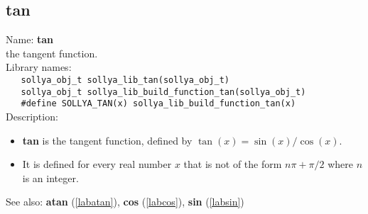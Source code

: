 \subsection{tan}
\label{labtan}
\noindent Name: \textbf{tan}\\
\phantom{aaa}the tangent function.\\[0.2cm]
\noindent Library names:\\
\verb|   sollya_obj_t sollya_lib_tan(sollya_obj_t)|\\
\verb|   sollya_obj_t sollya_lib_build_function_tan(sollya_obj_t)|\\
\verb|   #define SOLLYA_TAN(x) sollya_lib_build_function_tan(x)|\\[0.2cm]
\noindent Description: \begin{itemize}

\item \textbf{tan} is the tangent function, defined by $\tan(x) = \sin(x)/\cos(x)$.

\item It is defined for every real number $x$ that is not of the form $n\pi + \pi/2$ where $n$ is an integer.
\end{itemize}
See also: \textbf{atan} (\ref{labatan}), \textbf{cos} (\ref{labcos}), \textbf{sin} (\ref{labsin})
